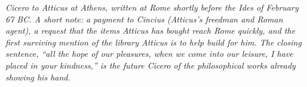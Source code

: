 
\textit{Cicero to Atticus at Athens, written at Rome shortly
before the Ides of February 67 BC. A short note: a payment
to Cincius (Atticus's freedman and Roman agent), a request
that the items Atticus has bought reach Rome quickly, and
the first surviving mention of the library Atticus is to
help build for him. The closing sentence, ``all the hope of
our pleasures, when we come into our leisure, I have placed
in your kindness,'' is the future Cicero of the philosophical
works already showing his hand.}
